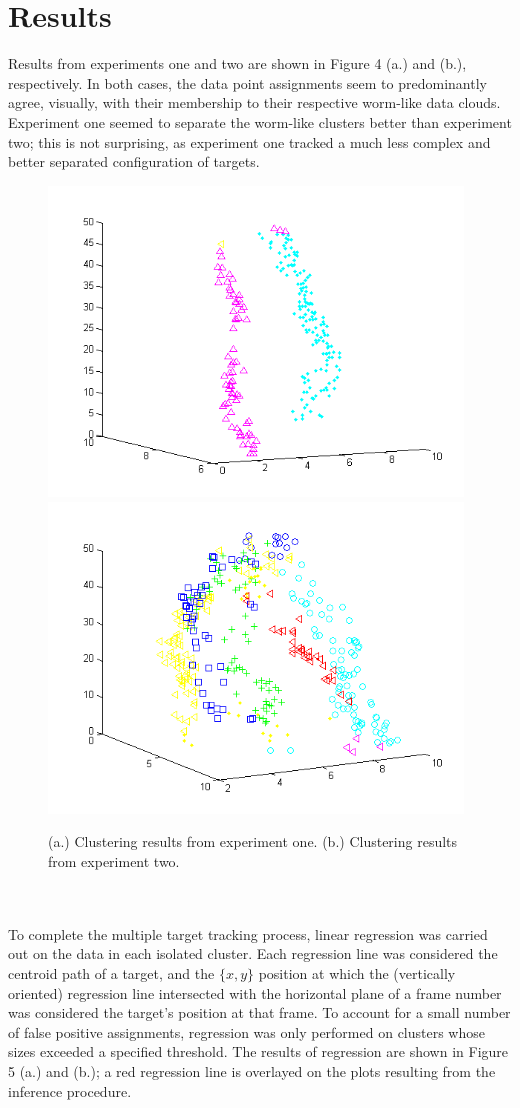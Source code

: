 \documentclass{article}
\begin{document}
\section{Results}
Results from experiments one and two are shown in Figure 4 (a.) and (b.), respectively. In both cases, the data point assignments seem to predominantly agree, visually, with their membership to their respective worm-like data clouds. Experiment one seemed to separate the worm-like clusters better than experiment two; this is not surprising, as experiment one tracked a much less complex and better separated configuration of targets.
\begin{figure}
\centering
{\includegraphics[width=110mm]{exp1_c.png}}
\hspace{8mm}
{\includegraphics[width=110mm]{exp2_a.png}}
\caption{(a.) Clustering results from experiment one. (b.) Clustering results from experiment two.}
\label{test}
\end{figure}
%
%
%
\\\\ To complete the multiple target tracking process, linear regression was carried out on the data in each isolated cluster. Each regression line was considered the centroid path of a target, and the $\{ x, y \}$ position at which the (vertically oriented) regression line intersected with the horizontal plane of a frame number was considered the target's position at that frame. To account for a small number of false positive assignments, regression was only performed on clusters whose sizes exceeded a specified threshold. The results of regression are shown in Figure 5 (a.) and (b.); a red regression line is overlayed on the plots resulting from the inference procedure.
\end{document}
